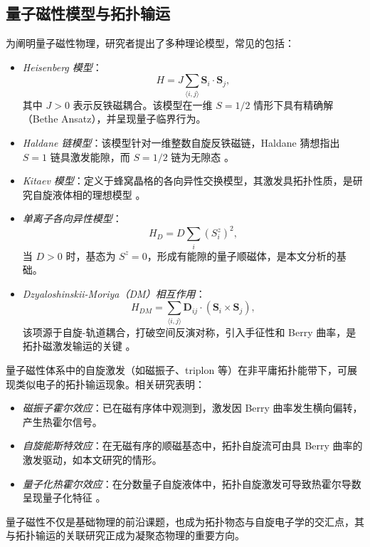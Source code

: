 \subsection{量子磁性模型与拓扑输运}

为阐明量子磁性物理，研究者提出了多种理论模型，常见的包括：

\begin{itemize}
    \item \emph{Heisenberg 模型}：
    \[
    H = J \sum_{\langle i,j \rangle} \mathbf{S}_i \cdot \mathbf{S}_j,
    \]
    其中 $J>0$ 表示反铁磁耦合。该模型在一维 $S=1/2$ 情形下具有精确解（Bethe Ansatz），并呈现量子临界行为。
    \item \emph{Haldane 链模型}：该模型针对一维整数自旋反铁磁链，Haldane 猜想指出 $S=1$ 链具激发能隙，而 $S=1/2$ 链为无隙态 \cite{haldane1983Continuum}。
    \item \emph{Kitaev 模型}：定义于蜂窝晶格的各向异性交换模型，其激发具拓扑性质，是研究自旋液体相的理想模型 \cite{kitaev2006Anyons}。
    \item \emph{单离子各向异性模型}：
    \[
    H_D = D \sum_i (S^z_i)^2,
    \]
    当 $D>0$ 时，基态为 $S^z=0$，形成有能隙的量子顺磁体，是本文分析的基础。
    \item \emph{Dzyaloshinskii-Moriya（DM）相互作用}：
    \[
    H_{DM} = \sum_{\langle i,j \rangle} \mathbf{D}_{ij} \cdot (\mathbf{S}_i \times \mathbf{S}_j),
    \]
    该项源于自旋-轨道耦合，打破空间反演对称，引入手征性和 Berry 曲率，是拓扑磁激发输运的关键 \cite{dzyaloshinsky1958thermodynamic}。
\end{itemize}

量子磁性体系中的自旋激发（如磁振子、triplon 等）在非平庸拓扑能带下，可展现类似电子的拓扑输运现象。相关研究表明：

\begin{itemize}
    \item \emph{磁振子霍尔效应}：已在磁有序体中观测到，激发因 Berry 曲率发生横向偏转，产生热霍尔信号。
    \item \emph{自旋能斯特效应}：在无磁有序的顺磁基态中，拓扑自旋流可由具 Berry 曲率的激发驱动，如本文研究的情形。
    \item \emph{量子化热霍尔效应}：在分数量子自旋液体中，拓扑自旋激发可导致热霍尔导数呈现量子化特征 \cite{kasahara2018Majorana}。
\end{itemize}

量子磁性不仅是基础物理的前沿课题，也成为拓扑物态与自旋电子学的交汇点，其与拓扑输运的关联研究正成为凝聚态物理的重要方向。

    
